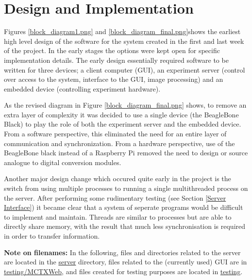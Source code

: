 \chapter{Design and Implementation}


Figures \ref{block_diagram1.png} and \ref{block_diagram_final.png}shows the earliest high level design of the software for the system created in the first and last week of the project. In the early stages the options were kept open for specific implementation details. The early design essentially required software to be written for three devices; a client computer (GUI), an experiment server (control over access to the system, interface to the GUI, image processing) and an embedded device (controlling experiment hardware). 


As the revised diagram in Figure \ref{block_diagram_final.png} shows, to remove an extra layer of complexity it was decided to use a single device (the BeagleBone Black) to play the role of both the experiment server and the embedded device. From a software perspective, this eliminated the need for an entire layer of communication and synchronization. From a hardware perspective, use of the BeagleBone black instead of a Raspberry Pi removed the need to design or source analogue to digital conversion modules.

Another major design change which occured quite early in the project is the switch from using multiple processes to running a single multithreaded process on the server. After performing some rudimentary testing (see Section \ref{Server Interface}) it became clear that a system of seperate programs would be difficult to implement and maintain. Threads are similar to processes but are able to directly share memory, with the result that much less synchronisation is required in order to transfer information.

{\bf Note on filenames:} In the following, files and directories related to the server are located in the \href{https://github.com/szmoore/MCTX3420/tree/master/server}{server} directory, files related to the (currently used) GUI are in \href{https://github.com/szmoore/MCTX3420/tree/master/testing/MCTXWeb}{testing/MCTXWeb}, and files created for testing purposes are located in \href{https://github.com/szmoore/MCTX3420/tree/master/testing}{testing}.

